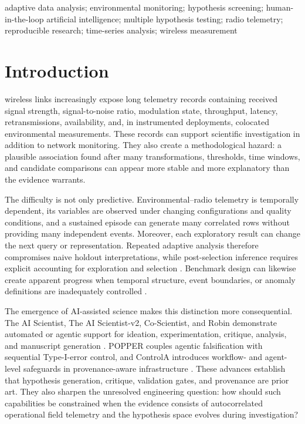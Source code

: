 \documentclass{ieeeaccess}
\begin{document}
\begin{keywords}
adaptive data analysis; environmental monitoring; hypothesis screening; human-in-the-loop artificial intelligence; multiple hypothesis testing; radio telemetry; reproducible research; time-series analysis; wireless measurement
\end{keywords}
\doi{}
\titlepgskip=-21pt
\maketitle
\section{Introduction}\label{introduction}

 wireless links increasingly expose long telemetry records containing received signal strength, signal-to-noise ratio, modulation state, throughput, latency, retransmissions, availability, and, in instrumented deployments, colocated environmental measurements. These records can support scientific investigation in addition to network monitoring. They also create a methodological hazard: a plausible association found after many transformations, thresholds, time windows, and candidate comparisons can appear more stable and more explanatory than the evidence warrants.

The difficulty is not only predictive. Environmental--radio telemetry is temporally dependent, its variables are observed under changing configurations and quality conditions, and a sustained episode can generate many correlated rows without providing many independent events. Moreover, each exploratory result can change the next query or representation. Repeated adaptive analysis therefore compromises naive holdout interpretations, while post-selection inference requires explicit accounting for exploration and selection \cite{REUSABLE-HOLDOUT-2015,POST-SELECTION-2022}. Benchmark design can likewise create apparent progress when temporal structure, event boundaries, or anomaly definitions are inadequately controlled \cite{TSAD-BENCHMARKS-2023}.

The emergence of AI-assisted science makes this distinction more consequential. The AI Scientist, The AI Scientist-v2, Co-Scientist, and Robin demonstrate automated or agentic support for ideation, experimentation, critique, analysis, and manuscript generation \cite{AI-SCIENTIST-2024,AI-SCIENTIST-V2-2025,CO-SCIENTIST-2026,ROBIN-2026}. POPPER couples agentic falsification with sequential Type-I-error control, and ControlA introduces workflow- and agent-level safeguards in provenance-aware infrastructure \cite{POPPER-2025,CONTROLA-2025}. These advances establish that hypothesis generation, critique, validation gates, and provenance are prior art. They also sharpen the unresolved engineering question: how should such capabilities be constrained when the evidence consists of autocorrelated operational field telemetry and the hypothesis space evolves during investigation?
\end{document}
